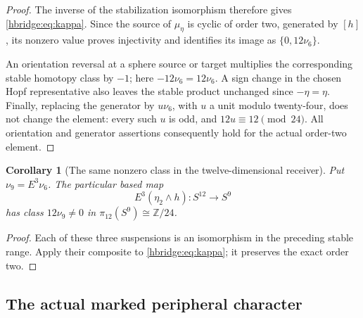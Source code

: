 \documentclass[11pt,letterpaper]{article}
\numberwithin{equation}{section}
\newtheorem{corollary}[theorem]{Corollary}
\theoremstyle{definition}
\theoremstyle{remark}
\begin{document}
\begin{proof}
The inverse of the stabilization isomorphism therefore gives
\eqref{hbridge:eq:kappa}. Since the source of \(\mu_\eta\) is
cyclic of order two, generated by \([h]\), its nonzero value
proves injectivity and identifies its image as
\(\{0,12\nu_6\}\).

An orientation reversal at a sphere source or target multiplies
the corresponding stable homotopy class by \(-1\); here
\(-12\nu_6=12\nu_6\). A sign change in the chosen Hopf
representative also leaves the stable product unchanged since
\(-\eta=\eta\). Finally, replacing the generator by
\(u\nu_6\), with \(u\) a unit modulo twenty-four, does not
change the element: every such \(u\) is odd, and
\(12u\equiv12\pmod{24}\). All orientation and generator
assertions consequently hold for the actual order-two element.
\end{proof}

\begin{corollary}[The same nonzero class in the twelve-dimensional receiver]
Put \(\nu_9=E^3\nu_6\). The particular based map
\[
E^3(\eta_2\wedge h):S^{12}\longrightarrow S^9
\]
has class \(12\nu_9\ne0\) in
\(\pi_{12}(S^9)\cong\mathbb Z/24\).
\end{corollary}
\begin{proof}
Each of these three suspensions is an isomorphism in the preceding
stable range. Apply their composite to
\eqref{hbridge:eq:kappa}; it preserves the exact order two.
\end{proof}

\subsection{The actual marked peripheral character}
\end{document}
